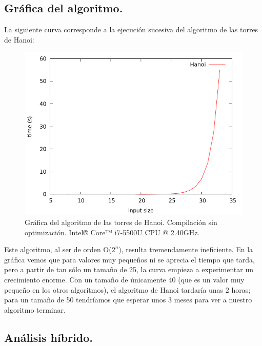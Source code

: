 \documentclass[11pt,a4paper]{article}
\begin{document}
		\subsection{Gráfica del algoritmo.}

			\par
			La siguiente curva corresponde a la ejecución sucesiva del algoritmo de las torres de Hanoi:

			\begin{figure}[h]

				\centering
				\includegraphics[width=1\textwidth]{hanoi.png}
				\caption{Gráfica del algoritmo de las torres de Hanoi. Compilación sin optimización. Intel® Core™ i7-5500U CPU @ 2.40GHz.}

			\end{figure}

			\par
			Este algoritmo, al ser de orden O($2^n$), resulta tremendamente ineficiente. En la gráfica vemos que para valores muy pequeños ni se aprecia el tiempo que tarda, pero a partir de tan sólo un tamaño de 25, la curva empieza a experimentar un crecimiento
			enorme. Con un tamaño de únicamente 40 (que es un valor muy pequeño en los otros algoritmos), el algoritmo de Hanoi tardaría unas 2 horas; para un tamaño de 50 tendríamos que esperar unos 3 meses para ver a nuestro algoritmo terminar.

\newpage

		\subsection{Análisis híbrido.}
\end{document}
